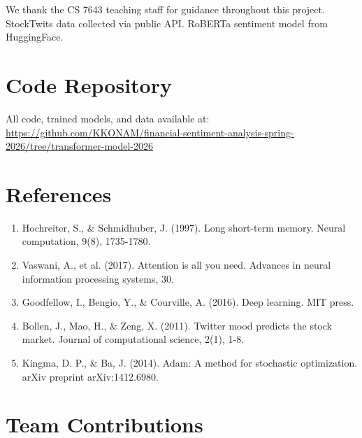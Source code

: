 \documentclass[10pt,twocolumn]{article}
\begin{document}
We thank the CS 7643 teaching staff for guidance throughout this project. StockTwits data collected via public API. RoBERTa sentiment model from HuggingFace.

\section*{Code Repository}

All code, trained models, and data available at:\\
\url{https://github.com/KKONAM/financial-sentiment-analysis-spring-2026/tree/transformer-model-2026}

\newpage

\section*{References}

\begin{enumerate}
\item Hochreiter, S., \& Schmidhuber, J. (1997). Long short-term memory. Neural computation, 9(8), 1735-1780.
\item Vaswani, A., et al. (2017). Attention is all you need. Advances in neural information processing systems, 30.
\item Goodfellow, I., Bengio, Y., \& Courville, A. (2016). Deep learning. MIT press.
\item Bollen, J., Mao, H., \& Zeng, X. (2011). Twitter mood predicts the stock market. Journal of computational science, 2(1), 1-8.
\item Kingma, D. P., \& Ba, J. (2014). Adam: A method for stochastic optimization. arXiv preprint arXiv:1412.6980.
\end{enumerate}

\newpage

\section*{Team Contributions}
\end{document}
